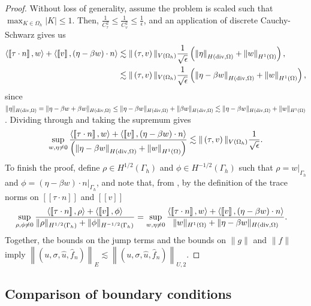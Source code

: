 \documentclass[11pt,onecolumn]{scrartcl}
\newcommand{\nor}[1]{\left\| #1 \right\|}
\newcommand{\LRs}[1]{\left[ #1 \right]}
\newcommand{\jump}[1] {\ensuremath{\LRs{\![#1]\!}}}
\newcommand{\Oh}{\Omega_h}
\begin{document}
\begin{proof}
Without loss of generality, assume the problem is scaled such that $\max_{K\in\Oh}|K| \leq 1$. Then, $\frac{1}{C_\tau^2}\leq \frac{1}{C_v^2} \leq \frac{1}{\epsilon}$, and an application of discrete Cauchy-Schwarz gives us 
\begin{align*}
\langle \jump{\tau\cdot n},w\rangle + \langle \jump{v},\left(\eta - \beta w\right)\cdot n\rangle &\lesssim \|\left(\tau,v\right)\|_{V(\Oh)}\frac{1}{\sqrt{\epsilon}}\left(\nor{\eta}_{H({\rm div},\Omega)} + \nor{w}_{H^1(\Omega)}\right),\\
&\lesssim \|\left(\tau,v\right)\|_{V(\Oh)}\frac{1}{\sqrt{\epsilon}}\left(\nor{\eta-\beta w}_{H({\rm div},\Omega)} + \nor{w}_{H^1(\Omega)}\right),
\end{align*}
since $\|\eta\|_{H({\rm div},\Omega)} = \|\eta - \beta w + \beta w\|_{H({\rm div},\Omega)} \leq \|\eta - \beta w\|_{H({\rm div},\Omega)} + \|\beta w\|_{H({\rm div},\Omega)} \lesssim \|\eta-\beta w\|_{H({\rm div},\Omega)} + \|w\|_{H^1(\Omega)}$.  Dividing through and taking the supremum gives
\[
\sup_{w,\eta \neq 0} \frac{\langle\jump{\tau\cdot n},w\rangle + \langle \jump{v},\left(\eta - \beta w\right)\cdot n\rangle}{\left(\nor{\eta-\beta w}_{H({\rm div},\Omega)} + \nor{w}_{H^1(\Omega)}\right)} \lesssim \|\left(\tau,v\right)\|_{V(\Oh)}\frac{1}{\sqrt{\epsilon}}.
\]
To finish the proof, define $\rho \in H^{1/2}(\Gamma_h)$ and $\phi \in H^{-1/2}(\Gamma_h)$ such that $\rho = \left.w\right|_{\Gamma_h}$ and $\phi = \left.(\eta-\beta w)\cdot n\right|_{\Gamma_h}$, and note that, from \cite{analysisDPG}, by the definition of the trace norms on $\jump{\tau\cdot n}$ and $\jump{v}$ 
\begin{align*}
\sup_{\rho,\phi \neq 0} \frac{\langle \jump{\tau\cdot n},\rho\rangle + \langle \jump{v},\phi \rangle}{\|\rho\|_{H^{1/2}(\Gamma_h)}+\|\phi\|_{H^{-1/2}(\Gamma_h)}} &= \sup_{w,\eta \neq 0} \frac{\langle \jump{\tau\cdot n},w\rangle + \langle \jump{v},\left(\eta - \beta w\right)\cdot n\rangle}{ \|w\|_{H^1(\Omega)}+\|\eta-\beta w\|_{H({\rm div},\Omega)}}.
\end{align*}
Together, the bounds on the jump terms and the bounds on $\|g\|$ and $\|f\|$ imply $\left\|\left(u,\sigma,\widehat{u},\widehat{f}_n\right)\right\|_{E} \lesssim \left\|\left(u,\sigma,\widehat{u},\widehat{f}_n\right)\right\|_{U,2}$.
\end{proof}

\subsection{Comparison of boundary conditions}
\end{document}
